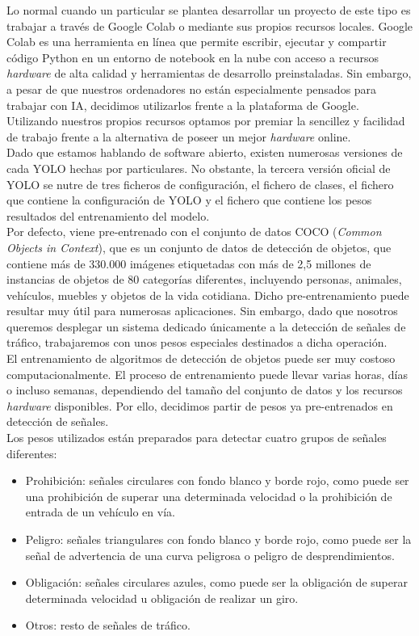 Lo normal cuando un particular se plantea desarrollar un proyecto de este tipo es trabajar a través de Google Colab o mediante sus propios recursos locales. Google Colab es una herramienta en línea que permite escribir, ejecutar y compartir código Python en un entorno de notebook en la nube con acceso a recursos \textit{hardware} de alta calidad y herramientas de desarrollo preinstaladas. Sin embargo, a pesar de que nuestros ordenadores no están especialmente pensados para trabajar con IA, decidimos utilizarlos frente a la plataforma de Google. Utilizando nuestros propios recursos optamos por premiar la sencillez y facilidad de trabajo frente a la alternativa de poseer un mejor \textit{hardware} online.\\

Dado que estamos hablando de software abierto, existen numerosas versiones de cada YOLO hechas por particulares. No obstante, la tercera versión oficial de YOLO se nutre de tres ficheros de configuración, el fichero de clases, el fichero que contiene la configuración de YOLO y el fichero que contiene los pesos resultados del entrenamiento del modelo.\\

Por defecto, viene pre-entrenado con el conjunto de datos COCO (\textit{Common Objects in Context}), que es un conjunto de datos de detección de objetos, que contiene más de 330.000 imágenes etiquetadas con más de 2,5 millones de instancias de objetos de 80 categorías diferentes, incluyendo personas, animales, vehículos, muebles y objetos de la vida cotidiana. Dicho pre-entrenamiento puede resultar muy útil para numerosas aplicaciones. Sin embargo, dado que nosotros queremos desplegar un sistema dedicado únicamente a la detección de señales de tráfico, trabajaremos con unos pesos especiales destinados a dicha operación.\\

El entrenamiento de algoritmos de detección de objetos puede ser muy costoso computacionalmente. El proceso de entrenamiento puede llevar varias horas, días o incluso semanas, dependiendo del tamaño del conjunto de datos y los recursos \textit{hardware} disponibles. Por ello, decidimos partir de pesos ya pre-entrenados en detección de señales.\\

Los pesos utilizados están preparados para detectar cuatro grupos de señales diferentes:\\
\begin{itemize}
\item Prohibición: señales circulares con fondo blanco y borde rojo, como puede ser una prohibición de superar una determinada velocidad o la prohibición de entrada de un vehículo en vía.
\item Peligro: señales triangulares con fondo blanco y borde rojo, como puede ser la señal de advertencia de una curva peligrosa o peligro de desprendimientos.
\item Obligación: señales circulares azules, como puede ser la obligación de superar determinada velocidad u obligación de realizar un giro.
\item Otros: resto de señales de tráfico.
\end{itemize}

